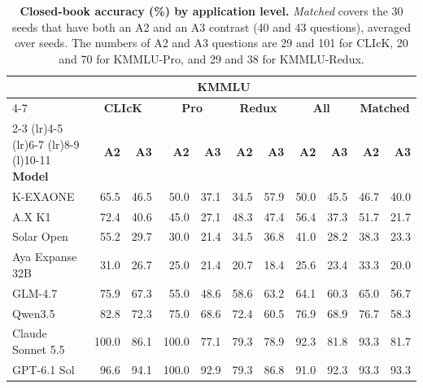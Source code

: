 \begin{table}[t]
\centering
\small
\caption{\textbf{Closed-book accuracy (\%) by application level.}
\textit{Matched} covers the 30 seeds that have both an A2 and an A3 contrast (40 and 43 questions), averaged over seeds.
The numbers of A2 and A3 questions are 29 and 101 for CLIcK, 20 and 70 for KMMLU-Pro, and 29 and 38 for KMMLU-Redux.}
\label{tab:matched}
\begin{tabular}{@{}l|rrrrrrrr|rr@{}}
\toprule
 & & & \multicolumn{4}{c}{\textbf{KMMLU}} & & & & \\
\cmidrule(lr){4-7}
 & \multicolumn{2}{c}{\textbf{CLIcK}} & \multicolumn{2}{c}{\textbf{Pro}} & \multicolumn{2}{c}{\textbf{Redux}} & \multicolumn{2}{c}{\textbf{All}} & \multicolumn{2}{c}{\textbf{Matched}} \\
\cmidrule(lr){2-3} \cmidrule(lr){4-5} \cmidrule(lr){6-7} \cmidrule(lr){8-9} \cmidrule(l){10-11}
\textbf{Model} & \textbf{A2} & \textbf{A3} & \textbf{A2} & \textbf{A3} & \textbf{A2} & \textbf{A3} & \textbf{A2} & \textbf{A3} & \textbf{A2} & \textbf{A3} \\
\midrule
K-EXAONE          & 65.5  & 46.5 & 50.0  & 37.1 & 34.5 & 57.9 & 50.0 & 45.5 & 46.7 & 40.0 \\
A.X K1            & 72.4  & 40.6 & 45.0  & 27.1 & 48.3 & 47.4 & 56.4 & 37.3 & 51.7 & 21.7 \\
Solar Open        & 55.2  & 29.7 & 30.0  & 21.4 & 34.5 & 36.8 & 41.0 & 28.2 & 38.3 & 23.3 \\
\midrule
Aya Expanse 32B   & 31.0  & 26.7 & 25.0  & 21.4 & 20.7 & 18.4 & 25.6 & 23.4 & 33.3 & 20.0 \\
\midrule
GLM-4.7           & 75.9  & 67.3 & 55.0  & 48.6 & 58.6 & 63.2 & 64.1 & 60.3 & 65.0 & 56.7 \\
Qwen3.5           & 82.8  & 72.3 & 75.0  & 68.6 & 72.4 & 60.5 & 76.9 & 68.9 & 76.7 & 58.3 \\
\midrule
Claude Sonnet 5.5 & 100.0 & 86.1 & 100.0 & 77.1 & 79.3 & 78.9 & 92.3 & 81.8 & 93.3 & 81.7 \\
GPT-6.1 Sol       & 96.6  & 94.1 & 100.0 & 92.9 & 79.3 & 86.8 & 91.0 & 92.3 & 93.3 & 93.3 \\
\bottomrule
\end{tabular}
\vspace{-0.1in}
\end{table}